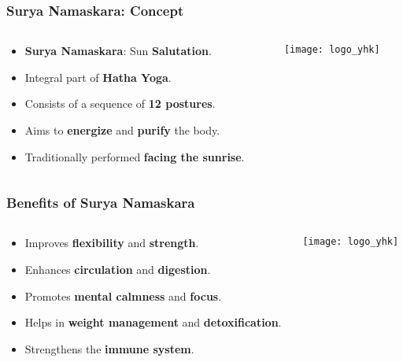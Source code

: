 \begin{frame}[fragile]\frametitle{Surya Namaskara: Concept}
\begin{columns}
    \begin{column}[T]{0.5\linewidth}
      \begin{itemize}
        \item \textbf{Surya Namaskara}: Sun \textbf{Salutation}.
        \item Integral part of \textbf{Hatha Yoga}.
        \item Consists of a sequence of \textbf{12 postures}.
        \item Aims to \textbf{energize} and \textbf{purify} the body.
        \item Traditionally performed \textbf{facing the sunrise}.
      \end{itemize}
    \end{column}
    \begin{column}[T]{0.5\linewidth}
        \begin{center}
        \texttt{[image: logo\_yhk]}
        \end{center}	
    \end{column}
\end{columns}
\end{frame}

\begin{frame}[fragile]\frametitle{Benefits of Surya Namaskara}
\begin{columns}
    \begin{column}[T]{0.5\linewidth}
      \begin{itemize}
        \item Improves \textbf{flexibility} and \textbf{strength}.
        \item Enhances \textbf{circulation} and \textbf{digestion}.
        \item Promotes \textbf{mental calmness} and \textbf{focus}.
        \item Helps in \textbf{weight management} and \textbf{detoxification}.
        \item Strengthens the \textbf{immune system}.
      \end{itemize}
    \end{column}
    \begin{column}[T]{0.5\linewidth}
        \begin{center}
        \texttt{[image: logo\_yhk]}
        \end{center}	
    \end{column}
\end{columns}
\end{frame}

